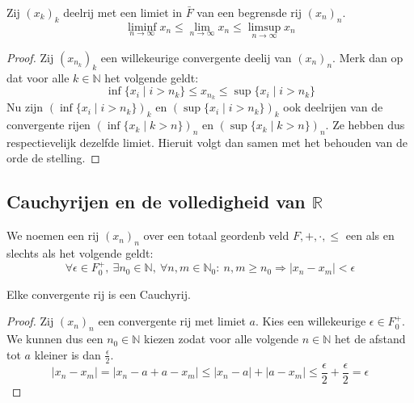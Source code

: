 \documentclass[main.tex]{subfiles}
\begin{document}
\begin{pr}
  Zij $(x_{k})_{k}$ deelrij met een limiet in $\bar{F}$ van een begrensde rij $(x_{n})_{n}$.
  \[ \liminf_{n\rightarrow \infty} x_{n} \le \lim_{n\rightarrow \infty} x_{n} \le \limsup_{n\rightarrow \infty} x_{n} \]

  \begin{proof}
    Zij $(x_{n_{k}})_{k}$ een willekeurige convergente deelij van $(x_{n})_{n}$.
    Merk dan op dat voor alle $k\in \mathbb{N}$ het volgende geldt:
    \[ \inf\{x_{i}\mid i>n_{k}\} \le x_{n_{k}} \le \sup\{x_{i}\mid i>n_{k}\}\]
    Nu zijn $(\inf\{x_{i}\mid i>n_{k}\})_{k}$ en $(\sup\{x_{i}\mid i>n_{k}\})_{k}$ ook deelrijen van de convergente rijen $(\inf\{x_{k}\mid k>n\})_{n}$ en $(\sup\{x_{k}\mid k>n\})_{n}$.
    Ze hebben dus respectievelijk dezelfde limiet.
    Hieruit volgt dan samen met het behouden van de orde de stelling.
  \end{proof}
\end{pr}

\subsection{Cauchyrijen en de volledigheid van $\mathbb{R}$}
\label{sec:cauchyrijen-en-de}

\begin{de}
  We noemen een rij $(x_{n})_{n}$ over een totaal geordenb veld $F,+,\cdot,\le$ een  als en slechts als het volgende geldt:
  \[ \forall \epsilon \in F_{0}^{+},\ \exists n_{0}\in \mathbb{N},\ \forall n,m \in \mathbb{N}_{0}:\ n,m \ge n_{0} \Rightarrow |x_{n}-x_{m}| < \epsilon \]
\end{de}

\begin{pr}
  Elke convergente rij is een Cauchyrij.
  
  \begin{proof}
    Zij $(x_{n})_{n}$ een convergente rij met limiet $a$.
    Kies een willekeurige $\epsilon\in F_{0}^{+}$.
    We kunnen dus een $n_{0}\in \mathbb{N}$ kiezen zodat voor alle volgende $n\in\mathbb{N}$ het de afstand tot $a$ kleiner is dan $\frac{\epsilon}{2}$.
    \[ |x_{n}-x_{m}| = |x_{n}-a+a-x_{m}| \le |x_{n}-a|+|a-x_{m}| \le \frac{\epsilon}{2}+\frac{\epsilon}{2}=\epsilon \]
  \end{proof}
\end{pr}
\end{document}
